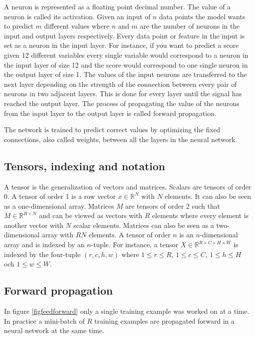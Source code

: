 \documentclass[a4paper, twoside]{article}
\begin{document}
A neuron is represented as a floating point decimal number. The value of a neuron is called its activation. Given an input of $n$ data points the model wants to predict $m$ different values where $n$ and $m$ are the number of neurons in the input and output layers respectively. Every data point or feature in the input is set as a neuron in the input layer. For instance, if you want to predict a score given 12 different variables every single variable would correspond to a neuron in the input layer of size 12 and the score would correspond to one single neuron in the output layer of size 1. The values of the input neurons are transferred to the next layer depending on the strength of the connection between every pair of neurons in two adjacent layers. This is done for every layer until the signal has reached the output layer. The process of propagating the value of the neurons from the input layer to the output layer is called forward propagation. \cite{cs231n}

The network is trained to predict correct values by optimizing the fixed connections, also called weights, between all the layers in the neural network. \cite{cs231n}

\subsection{Tensors, indexing and notation}
A tensor is the generalization of vectors and matrices. Scalars are tensors of order 0. A tensor of order 1 is a row vector $x \in \mathbb{R}^N$ with $N$ elements. It can also be seen as a one-dimensional array. Matrices $M$ are tensors of order 2 such that $M \in \mathbb{R}^{R \times N}$ and can be viewed as vectors with $R$ elements where every element is another vector with $N$ scalar elements. Matrices can also be seen as a two-dimensional array with $RN$ elements. A tensor of order $n$ is an $n$-dimensional array and is indexed by an $n$-tuple. For instance, a tensor $X \in \mathbb{R}^{R \times C \times H \times W}$ is indexed by the four-tuple $(r,c,h,w)$ where $1 \leq r \leq R$, $1 \leq c \leq C$, $1 \leq h \leq H$ och $1 \leq w \leq W$. \cite{cs231n}

\subsection{Forward propagation}
In figure \ref{figfeedforward} only a single training example was worked on at a time. In practice a mini-batch of $R$ training examples are propagated forward in a neural network at the same time. \cite{cs231n} \cite{wikiStanford}
\end{document}
